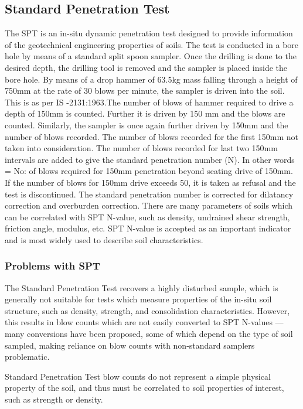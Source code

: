 \subsection{Standard Penetration Test}
The SPT is an in-situ dynamic penetration test designed to provide information of the geotechnical engineering properties of soils. The test is conducted in a bore hole by means of a standard split spoon sampler. Once the drilling is done to the desired depth, the drilling tool is removed and the sampler is placed inside the bore hole. By means of a drop hammer of 63.5kg mass falling through a height of 750mm at the rate of 30 blows per minute, the sampler is driven into the soil. This is as per IS -2131:1963.The number of blows of hammer required to drive a depth of 150mm is counted. Further it is driven by 150 mm and the blows are counted. Similarly, the sampler is once again further driven by 150mm and the number of blows recorded. The number of blows recorded for the first 150mm not taken into consideration. The number of blows recorded for last two 150mm intervals are added to give the standard penetration number (N). In other words = No: of blows required for 150mm penetration beyond seating drive of 150mm. If the number of blows for 150mm drive exceeds 50, it is taken as refusal and the test is discontinued. The standard penetration number is corrected for dilatancy correction and overburden correction. There are many parameters of soils which can be correlated with SPT N-value, such as density, undrained shear strength, friction angle, modulus, etc. SPT N-value is accepted as an important indicator and is most widely used to describe soil characteristics.\cite{mahoto_bearing_2012}
\subsubsection{Problems with SPT}
The Standard Penetration Test recovers a highly disturbed sample, which is generally not suitable for tests which measure properties of the in-situ soil structure, such as density, strength, and consolidation characteristics. However, this results in blow counts which are not easily converted to SPT N-values — many conversions have been proposed, some of which depend on the type of soil sampled, making reliance on blow counts with non-standard samplers problematic.
\par
Standard Penetration Test blow counts do not represent a simple physical property of the soil, and thus must be correlated to soil properties of interest, such as strength or density.
